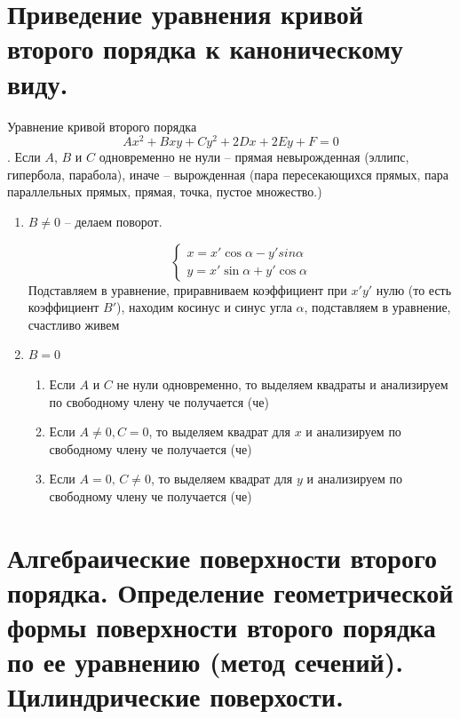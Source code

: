 \documentclass{article}
\begin{document}
\section{Приведение уравнения кривой второго порядка к каноническому виду.}
Уравнение кривой второго порядка $$ Ax^2+Bxy+Cy^2+2Dx+2Ey+F=0 $$. Если $A$, $B$ и $C$ одновременно не нули -- прямая невырожденная (эллипс, гипербола, парабола), иначе -- вырожденная (пара пересекающихся прямых, пара параллельных прямых,
прямая, точка, пустое множество.)

\begin{enumerate}
    \item $B\neq 0$ -- делаем поворот.
    
    $$ \begin{cases}x=x'\cos\alpha-y'sin\alpha \\ y=x'\sin\alpha+y'\cos\alpha \end{cases} $$
    Подставляем в уравнение, приравниваем коэффициент при $x'y'$  нулю (то есть коэффициент $B'$), находим косинус и синус угла $\alpha$, подставляем в уравнение, счастливо живем
    \item $B=0$
    \begin{enumerate}
        \item Если $A$ и $C$ не нули одновременно, то выделяем квадраты и анализируем по свободному члену че получается (че)
        \item Если $A\neq0,C=0$, то выделяем квадрат для $x$ и анализируем по свободному члену че получается (че)
        \item Если $A=0,\,C\neq0$, то выделяем квадрат для $y$ и анализируем по свободному члену че получается (че)
    \end{enumerate}
\end{enumerate}
\newpage
\section{Алгебраические поверхности второго порядка. Определение геометрической формы поверхности второго порядка по ее уравнению (метод сечений). Цилиндрические поверхости.}
\end{document}
